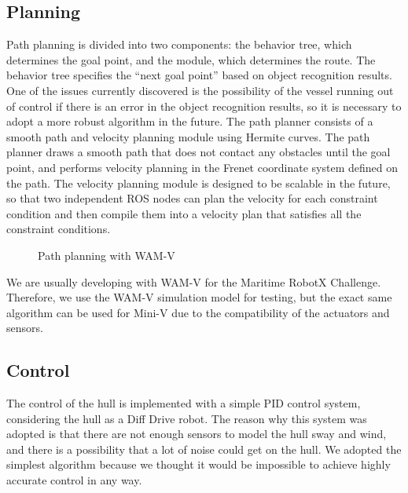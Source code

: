 \documentclass[lettersize,journal]{IEEEtran}
\begin{document}
\subsection{Planning}

Path planning is divided into two components: the behavior tree, which determines the goal point, and the module, which determines the route.
The behavior tree specifies the “next goal point” based on object recognition results.
One of the issues currently discovered is the possibility of the vessel running out of control if there is an error in the object recognition results, so it is necessary to adopt a more robust algorithm in the future.
The path planner consists of a smooth path and velocity planning module using Hermite curves.
The path planner draws a smooth path that does not contact any obstacles until the goal point, and performs velocity planning in the Frenet coordinate system defined on the path.
The velocity planning module is designed to be scalable in the future, so that two independent ROS nodes can plan the velocity for each constraint condition and then compile them into a velocity plan that satisfies all the constraint conditions.

\begin{figure}[H]
  \begin{center}
  \end{center}
  \caption{Path planning with WAM-V}
  \label{fig:planning}
\end{figure}

We are usually developing with WAM-V for the Maritime RobotX Challenge. Therefore, we use the WAM-V simulation model for testing, but the exact same algorithm can be used for Mini-V due to the compatibility of the actuators and sensors.

\subsection{Control}

The control of the hull is implemented with a simple PID control system, considering the hull as a Diff Drive robot.
The reason why this system was adopted is that there are not enough sensors to model the hull sway and wind, and there is a possibility that a lot of noise could get on the hull.
We adopted the simplest algorithm because we thought it would be impossible to achieve highly accurate control in any way.
\end{document}
